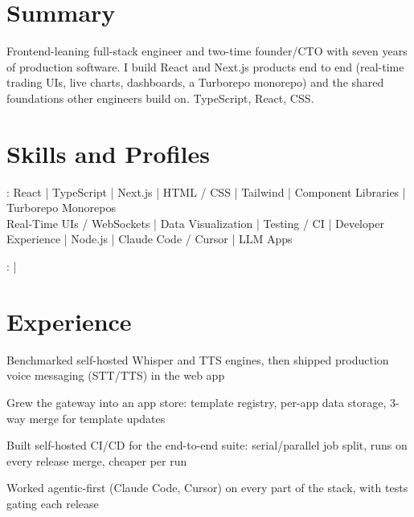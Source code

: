 \documentclass[print]{jack-resume}
\begin{document}
\pagecolor{darkmodeBackground}


\begin{minipage}[t][1cm][t]{.03\textwidth}
    \hfill
\end{minipage}

\section{Summary}
Frontend-leaning full-stack engineer and two-time founder/CTO with seven years of production software. I build React and Next.js products end to end (real-time trading UIs, live charts, dashboards, a Turborepo monorepo) and the shared foundations other engineers build on. TypeScript, React, CSS.
\sectionsep

\section{Skills and Profiles}
:
React \hfill | \hfill
TypeScript \hfill | \hfill
Next.js \hfill | \hfill
HTML / CSS \hfill | \hfill
Tailwind \hfill | \hfill
Component Libraries \hfill | \hfill
Turborepo Monorepos \\
\hspace{1.0cm} Real-Time UIs / WebSockets \hfill | \hfill
Data Visualization \hfill | \hfill
Testing / CI \hfill | \hfill
Developer Experience \hfill | \hfill
Node.js \hfill | \hfill
Claude Code / Cursor \hfill | \hfill
LLM Apps \\

\raggedright{
    :
      \href{https://www.linkedin.com/in/jack-sturtevant/}{ \ExternalLink} |
     \href{https://github.com/jacksturt}{ \ExternalLink}}

\section{Experience}

\begin{tightemize}
    \item Benchmarked self-hosted Whisper and TTS engines, then shipped production voice messaging (STT/TTS) in the web app
    \item Grew the gateway into an app store: template registry, per-app data storage, 3-way merge for template updates
    \item Built self-hosted CI/CD for the end-to-end suite: serial/parallel job split, runs on every release merge, cheaper per run
    \item Worked agentic-first (Claude Code, Cursor) on every part of the stack, with tests gating each release
\end{tightemize}
\sectionsep
\end{document}
